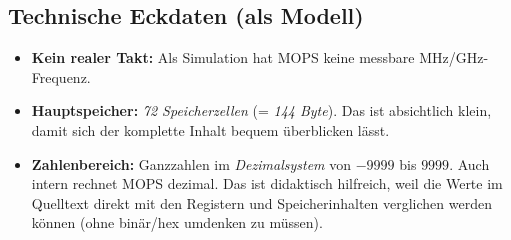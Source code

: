 \documentclass[../skript/main.tex]{subfiles}
\begin{document}
	\subsection{Technische Eckdaten (als Modell)}
	\begin{itemize}
		\item \textbf{Kein realer Takt:} Als Simulation hat MOPS keine messbare MHz/GHz-Frequenz.
		\item \textbf{Hauptspeicher:} \emph{72 Speicherzellen} (= \emph{144 Byte}). Das ist absichtlich klein,
		damit sich der komplette Inhalt bequem überblicken lässt.
		\item \textbf{Zahlenbereich:} Ganzzahlen im \emph{Dezimalsystem} von \(-9999\) bis \(9999\).
		Auch intern rechnet MOPS dezimal. Das ist didaktisch hilfreich, weil die Werte im
		Quelltext direkt mit den Registern und Speicherinhalten verglichen werden können
		(ohne binär/hex umdenken zu müssen).
	\end{itemize}

	
\end{document}
